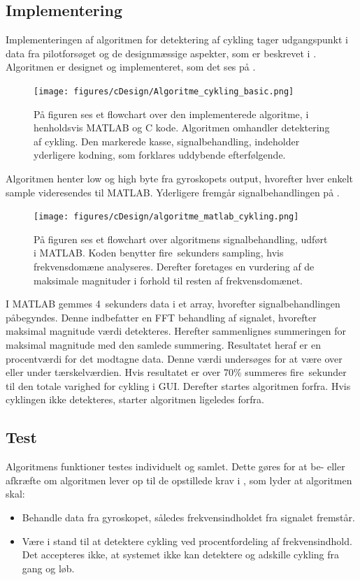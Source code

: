 \subsection{Implementering}
Implementeringen af algoritmen for detektering af cykling tager udgangspunkt i data fra pilotforsøget og de designmæssige aspekter, som er beskrevet i . Algoritmen er designet og implementeret, som det ses på .
\begin{figure}[H]
	\centering
	\texttt{[image: figures/cDesign/Algoritme\_cykling\_basic.png]}
	\caption{På figuren ses et flowchart over den implementerede algoritme, i henholdsvis MATLAB og C kode. Algoritmen omhandler detektering af cykling. Den markerede kasse, signalbehandling, indeholder yderligere kodning, som forklares uddybende efterfølgende.}
	\label{fig:basic_cykling}
\end{figure}\vspace{-0.25cm}
Algoritmen henter low og high byte fra gyroskopets output, hvorefter hver enkelt sample videresendes til MATLAB. Yderligere fremgår signalbehandlingen på .
\begin{figure}[H]
	\centering
	\texttt{[image: figures/cDesign/algoritme\_matlab\_cykling.png]}
	\caption{På figuren ses et flowchart over algoritmens signalbehandling, udført i MATLAB. Koden benytter fire~sekunders sampling, hvis frekvensdomæne analyseres. Derefter foretages en vurdering af de maksimale magnituder i forhold til resten af frekvensdomænet.}
	\label{fig:matlab_cykling}
\end{figure}\vspace{-0.25cm}
I MATLAB gemmes 4~sekunders data i et array, hvorefter signalbehandlingen påbegyndes. Denne indbefatter en FFT behandling af signalet, hvorefter maksimal magnitude værdi detekteres. Herefter sammenlignes summeringen for maksimal magnitude med den samlede summering. Resultatet heraf er en procentværdi for det modtagne data. Denne værdi undersøges for at være over eller under tærskelværdien. Hvis resultatet er over 70\% summeres fire~sekunder til den totale varighed for cykling i GUI. Derefter startes algoritmen forfra. Hvis cyklingen ikke detekteres, starter algoritmen ligeledes forfra. 

\subsection{Test}
Algoritmens funktioner testes individuelt og samlet. Dette gøres for at be- eller afkræfte om algoritmen lever op til de opstillede krav i , som lyder at algoritmen skal:
\begin{itemize}
	\item Behandle data fra gyroskopet, således frekvensindholdet fra signalet fremstår.
	\item Være i stand til at detektere cykling ved procentfordeling af frekvensindhold. Det accepteres ikke, at systemet ikke kan detektere og adskille cykling fra gang og løb.
\end{itemize}

